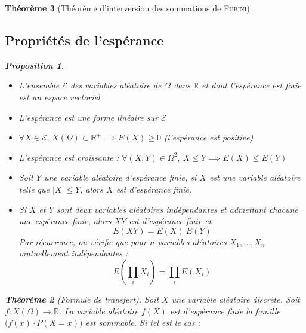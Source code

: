 \documentclass[11pt,a4paper]{report}
\newtheorem{theorem}{Théorème}[chapter]
\newtheorem{itheorem}[theorem]{Théorème}
\newtheorem{prop}[theorem]{Proposition}
\theoremstyle{definition}
\begin{document}
\begin{theorem}[Théorème d'interversion des sommations de \textsc{Fubini}]
{{\subsection{Propriétés de l'espérance} %
\label{sub:esperance_proprietes}
\begin{prop}
     \begin{itemize}
         \item L'ensemble $\mathscr{E}$ des variables aléatoire de $\Omega$ dans $\ensuremath{\mathbb{R}}$ et dont l'espérance est finie est un espace vectoriel
         \item L'espérance est une forme linéaire sur $\mathscr{E}$
         \item $\forall X \in \mathscr{E},\, X(\Omega) \subset \ensuremath{\mathbb{R}}^+ \implies E(X) \ge 0$ (l'espérance est positive)
         \item L'espérance est croissante : $\forall (X,Y)\in \Omega^2,\: X \le Y \implies E(X) \le E(Y)$
         \item Soit $Y$ une variable aléatoire d'espérance finie, si $X$ est une variable aléatoire telle que $|X| \le Y$, alors $X$ est d'espérance finie.
         \item Si $X$ et $Y$ sont deux variables aléatoires \emph{indépendantes} \emph{et admettant chacune une espérance finie}, alors $XY$ est d'espérance finie et 
         \begin{equation*}
         E(XY) = E(X)\: E(Y)
         \end{equation*}
         Par récurrence, on vérifie que pour $n$ variables aléatoires $X_1,\ldots, X_n$ mutuellement indépendantes : 
         \begin{equation*}
              E \left( \prod_i X_i \right)  = \prod_i E(X_i)
         \end{equation*}
     \end{itemize}
\end{prop}
\begin{itheorem}[Formule de transfert]
     Soit $X$ une variable aléatoire discrète.\newline
     Soit $f : X(\Omega ) \longrightarrow \ensuremath{\mathbb{R}}$.\newline
     La variable aléatoire $f(X)$ est d'espérance finie \Longleftrightarrow la famille $\Big( f(x) \cdot P(X = x) \Big)$ est sommable. Si tel est le cas : 
     \begin{equation}

\end{equation}
\end{itheorem}}}
\end{theorem}
\end{document}

